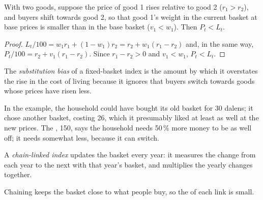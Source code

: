 \begin{proposition}\label{prop:g10:price-indices:substitution}
With two goods, suppose the price of good 1 rises relative to good 2 ($r_1 > r_2$), and buyers shift towards good 2, so that good 1's weight in the current
basket at base prices is smaller than in the base basket ($v_1 < w_1$). Then $P_t < L_t$.
\end{proposition}
\begin{proof}
$L_t/100 = w_1 r_1 + (1 - w_1) r_2 = r_2 + w_1 (r_1 - r_2)$ and, in the same way, $P_t/100 = r_2 + v_1 (r_1 - r_2)$. Since $r_1 - r_2 > 0$ and $v_1 < w_1$, $P_t < L_t$.
\end{proof}

\begin{definition}\label{def:g10:price-indices:substitution-bias}
The \emph{substitution bias} of a fixed-basket index is the amount by which it overstates the rise in the cost of living because it ignores
that buyers switch towards goods whose prices have risen less.
\end{definition}

In the example, the household could have bought its old basket for 30 dalens; it chose another basket, costing 26, which it presumably liked at least as
well at the new prices. The , 150, says the household needs 50\,\% more money to be as well off; it needs somewhat less, because it can switch.

\begin{definition}\label{def:g10:price-indices:chain-linked}
A \emph{chain-linked index} updates the basket every year: it measures the change from each year to the next with that year's basket,
and multiplies the yearly changes together.
\end{definition}

Chaining keeps the basket close to what people buy, so the  of each link is small.

